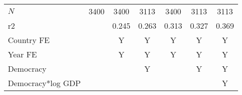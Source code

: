\documentclass[10pt,letterpaper,subeqn]{beamer}
\begin{document}
\begin{frame}
\begin{table}[htbp]
\begin{tabular}{l*{6}{c}}
\hline
\(N\)       &        3400         &        3400         &        3113         &        3400         &        3113         &        3113         \\
r2          &                     &       0.245         &       0.263         &       0.313         &       0.327         &       0.369         \\
\hline
Country FE        &                     &    Y                 &      Y               &     Y         &           Y          &     Y         \\
Year FE            &                     &    Y                 &      Y               &     Y         &           Y          &     Y         \\
Democracy       &                     &                     &     Y &                     &      Y  &      Y\\
Democracy*log GDP   &                     &                     &                     &                     &                     &      Y\\

\hline
\end{tabular}
\end{table}
\end{frame}
\end{document}
